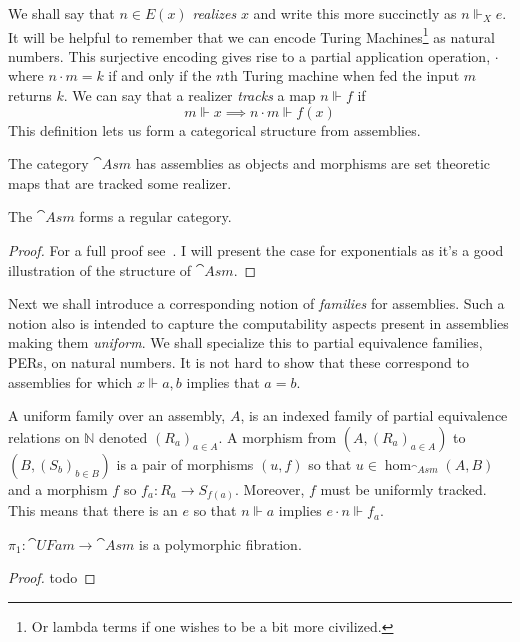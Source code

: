 We shall say that $n \in E(x)$ \emph{realizes} $x$ and write this more
succinctly as $n \Vdash_X e$. It will be helpful to remember that we
can encode Turing Machines\footnote{Or lambda terms if one wishes to
  be a bit more civilized.} as natural numbers. This surjective
encoding gives rise to a partial application operation, $\cdot$ where
$n \cdot m = k$ if and only if the $n$th Turing machine when fed the
input $m$ returns $k$. We can say that a realizer \emph{tracks} a map
$n \Vdash f$ if
\[
  m \Vdash x \implies n \cdot m \Vdash f(x)
\]
This definition lets us form a categorical structure from assemblies.
\begin{defn}\label{defn:systemf:asm}
  The category $\cat{Asm}$ has assemblies as objects and morphisms are
  set theoretic maps that are tracked some realizer.
\end{defn}
\begin{thm}\label{thm:systemf:asmregular}
  The $\cat{Asm}$ forms a regular category.
\end{thm}
\begin{proof}
  For a full proof see~\citet{VanOosten:08}. I will present the case
  for exponentials as it's a good illustration of the structure of
  $\cat{Asm}$.
\end{proof}
Next we shall introduce a corresponding notion of \emph{families} for
assemblies. Such a notion also is intended to capture the
computability aspects present in assemblies making them
\emph{uniform}. We shall specialize this to partial equivalence
families, PERs, on natural numbers. It is not hard to show that these
correspond to assemblies for which $x \Vdash a, b$ implies that $a =
b$.
\begin{defn}\label{defn:systemf:ufam}
  A uniform family over an assembly, $A$, is an indexed family of
  partial equivalence relations on $\mathbb{N}$ denoted
  $(R_a)_{a \in A}$. A morphism from $(A, (R_a)_{a \in A})$ to
  $(B, (S_b)_{b \in B})$ is a pair of morphisms $(u, f)$ so that
  $u \in \hom_{\cat{Asm}}(A, B)$ and a morphism $f$ so
  $f_a : R_a \to S_{f(a)}$. Moreover, $f$ must be uniformly
  tracked. This means that there is an $e$ so that $n \Vdash a$
  implies $e \cdot n \Vdash f_a$.
\end{defn}
\begin{thm}
  $\pi_1 : \cat{UFam} \to \cat{Asm}$ is a polymorphic fibration.
\end{thm}
\begin{proof}
  todo
\end{proof}
